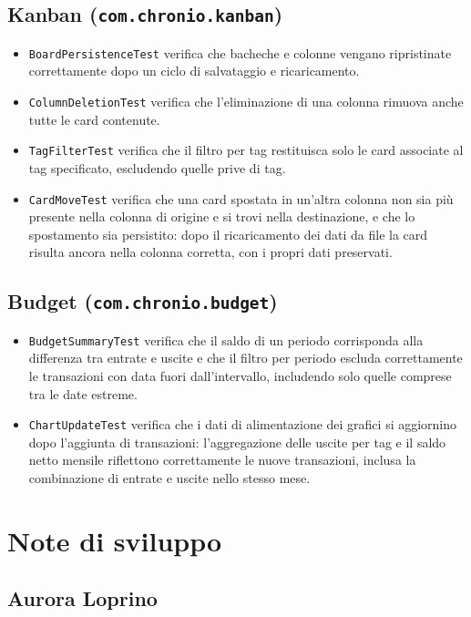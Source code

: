 \documentclass[a4paper,12pt]{report}
\begin{document}
\subsection*{Kanban (\texttt{com.chronio.kanban})}
\begin{itemize}
    \item \texttt{BoardPersistenceTest} verifica che bacheche e colonne vengano ripristinate correttamente dopo un ciclo di salvataggio e ricaricamento.
    \item \texttt{ColumnDeletionTest} verifica che l'eliminazione di una colonna rimuova anche tutte le card contenute.
    \item \texttt{TagFilterTest} verifica che il filtro per tag restituisca solo le card associate al tag specificato, escludendo quelle prive di tag.
    \item \texttt{CardMoveTest} verifica che una card spostata in un'altra
    colonna non sia più presente nella colonna di origine e si trovi nella
    destinazione, e che lo spostamento sia persistito: dopo il ricaricamento
    dei dati da file la card risulta ancora nella colonna corretta, con i
    propri dati preservati.
\end{itemize}

\subsection*{Budget (\texttt{com.chronio.budget})}

\begin{itemize}
  \item \texttt{BudgetSummaryTest} verifica che il saldo di un periodo
    corrisponda alla differenza tra entrate e uscite e che il filtro per
    periodo escluda correttamente le transazioni con data fuori
    dall'intervallo, includendo solo quelle comprese tra le date estreme.
  \item \texttt{ChartUpdateTest} verifica che i dati di alimentazione dei
    grafici si aggiornino dopo l'aggiunta di transazioni: l'aggregazione delle
    uscite per tag e il saldo netto mensile riflettono correttamente le nuove
    transazioni, inclusa la combinazione di entrate e uscite nello stesso mese.
\end{itemize}

\section{Note di sviluppo}

\subsection{Aurora Loprino}
\end{document}
